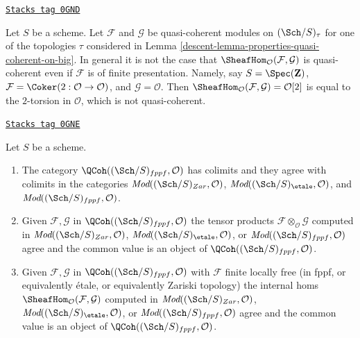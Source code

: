 \begin{example}
\label{descent-example-internal-hom-not-qcoh}
\href{https://stacks.math.columbia.edu/tag/0GND}{\texttt{Stacks tag 0GND}}

Let $S$ be a scheme. Let $\mathcal{F}$ and $\mathcal{G}$ be quasi-coherent
modules on $(\Sch/S)_\tau$ for one of the topologies $\tau$ considered in
Lemma \ref{descent-lemma-properties-quasi-coherent-on-big}.
In general it is not the case that
$\SheafHom_\mathcal{O}(\mathcal{F}, \mathcal{G})$
is quasi-coherent even if $\mathcal{F}$ is of finite presentation.
Namely, say $S = \Spec(\mathbf{Z})$,
$\mathcal{F} = \Coker(2 : \mathcal{O} \to \mathcal{O})$,
and $\mathcal{G} = \mathcal{O}$. Then
$\SheafHom_\mathcal{O}(\mathcal{F}, \mathcal{G}) = \mathcal{O}[2]$
is equal to the $2$-torsion in $\mathcal{O}$, which is not quasi-coherent.
\end{example}

\begin{lemma}[Qc colimits]
\label{descent-lemma-qc-colimits}
\href{https://stacks.math.columbia.edu/tag/0GNE}{\texttt{Stacks tag 0GNE}}

Let $S$ be a scheme.
\begin{enumerate}
\item The category $\QCoh((\Sch/S)_{fppf}, \mathcal{O})$
has colimits and they agree with colimits in the categories
$\textit{Mod}((\Sch/S)_{Zar}, \mathcal{O})$,
$\textit{Mod}((\Sch/S)_\etale, \mathcal{O})$, and
$\textit{Mod}((\Sch/S)_{fppf}, \mathcal{O})$.
\item Given $\mathcal{F}, \mathcal{G}$ in $\QCoh((\Sch/S)_{fppf}, \mathcal{O})$
the tensor products $\mathcal{F} \otimes_\mathcal{O} \mathcal{G}$
computed in $\textit{Mod}((\Sch/S)_{Zar}, \mathcal{O})$,
$\textit{Mod}((\Sch/S)_\etale, \mathcal{O})$, or
$\textit{Mod}((\Sch/S)_{fppf}, \mathcal{O})$ agree and the common value
is an object of $\QCoh((\Sch/S)_{fppf}, \mathcal{O})$.
\item Given $\mathcal{F}, \mathcal{G}$ in $\QCoh((\Sch/S)_{fppf}, \mathcal{O})$
with $\mathcal{F}$ finite locally free (in fppf, or equivalently \'etale, or
equivalently Zariski topology) the internal homs
$\SheafHom_\mathcal{O}(\mathcal{F}, \mathcal{G})$
computed in $\textit{Mod}((\Sch/S)_{Zar}, \mathcal{O})$,
$\textit{Mod}((\Sch/S)_\etale, \mathcal{O})$, or
$\textit{Mod}((\Sch/S)_{fppf}, \mathcal{O})$ agree and the common value
is an object of $\QCoh((\Sch/S)_{fppf}, \mathcal{O})$.
\end{enumerate}
\end{lemma}

